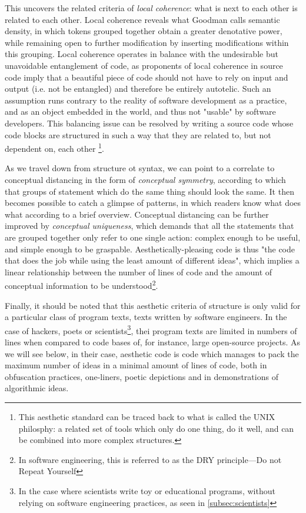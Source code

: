 This uncovers the related criteria of \emph{local coherence}: what is next to each other is related to each other. Local coherence reveals what Goodman calls semantic density, in which tokens grouped together obtain a greater denotative power, while remaining open to further modification by inserting modifications within this grouping. Local coherence operates in balance with the undesirable but unavoidable entanglement of code, as proponents of local coherence in source code imply that a beautiful piece of code should not have to rely on input and output (i.e. not be entangled) and therefore be entirely autotelic. Such an assumption runs contrary to the reality of software development as a practice, and as an object embedded in the world, and thus not "usable" by software developers. This balancing issue can be resolved by writing a source code whose code blocks are structured in such a way that they are related to, but not dependent on, each other \footnote{This aesthetic standard can be traced back to what is called the UNIX philosphy: a related set of tools which only do one thing, do it well, and can be combined into more complex structures.}.

As we travel down from structure ot syntax, we can point to a correlate to conceptual distancing in the form of \emph{conceptual symmetry}, according to which that groups of statement which do the same thing should look the same. It then becomes possible to catch a glimpse of patterns, in which readers know what does what according to a brief overview. Conceptual distancing can be further improved by \emph{conceptual uniqueness}, which demands that all the statements that are grouped together only refer to one single action: complex enough to be useful, and simple enough to be graspable. Aesthetically-pleasing code is thus "the code that does the job while using the least amount of different ideas", which implies a linear relationship between the number of lines of code and the amount of conceptual information to be understood\footnote{In software engineering, this is referred to as the DRY principle—Do not Repeat Yourself\citep{martin_clean_2008}}.

Finally, it should be noted that this aesthetic criteria of structure is only valid for a particular class of program texts, texts written by software engineers. In the case of hackers, poets or scientists\footnote{In the case where scientists write toy or educational programs, without relying on software engineering practices, as seen in \ref{subsec:scientists}}, thei program texts are limited in numbers of lines when compared to code bases of, for instance, large open-source projects. As we will see below, in their case, aesthetic code is code which manages to pack the maximum number of ideas in a minimal amount of lines of code, both in obfuscation practices, one-liners, poetic depictions and in demonstrations of algorithmic ideas.

